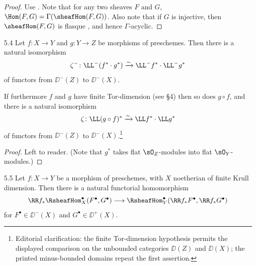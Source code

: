 \begin{proof}
Use . Note that for any two sheaves $F$ and $G$, $\Hom(F,G)=\Gamma(\sheafHom(F,G))$. Also note that if $G$ is injective, then $\sheafHom(F,G)$ is flasque \cite[\nopp II,~7.3.2]{G}, and hence $\Gamma$-acyclic.
\end{proof}

\begin{bookproposition}{5.4}\label{prop:2.5.4}
Let $f\colon X\to Y$ and $g\colon Y\to Z$ be morphisms of preschemes. Then there is a natural isomorphism
\[
\zeta^-\colon \LL^-(f^*\cdot g^*) \xrightarrow{\sim} \LL^-f^*\cdot \LL^-g^*
\]
of functors from $\DD^-(Z)$ to $\DD^-(X)$.

If furthermore $f$ and $g$ have finite Tor-dimension (see \S4) then so does $g\circ f$, and there is a natural isomorphism
\[
\zeta\colon \LL(g\circ f)^* \xrightarrow{\sim} \LL f^*\cdot \LL g^*
\]
of functors from $\DD^-(Z)$ to $\DD^-(X)$.\footnote{Editorial clarification: the finite Tor-dimension hypothesis permits the displayed comparison on the unbounded categories $\DD(Z)$ and $\DD(X)$; the printed minus-bounded domains repeat the first assertion.}
\end{bookproposition}

\begin{proof}
Left to reader. (Note that $g^*$ takes flat $\sO_Z$-modules into flat $\sO_Y$-modules.)
\end{proof}

\begin{bookproposition}{5.5}\label{prop:2.5.5}
Let $f\colon X\to Y$ be a morphism of preschemes, with $X$ noetherian of finite Krull dimension. Then there is a natural functorial homomorphism
\[
\RR f_* \RsheafHom^\bullet_X(F^\bullet,G^\bullet) \longrightarrow \RsheafHom^\bullet_Y(\RR f_*F^\bullet,\RR f_*G^\bullet)
\]
for $F^\bullet\in\DD^-(X)$ and $G^\bullet\in\DD^+(X)$.
\end{bookproposition}

